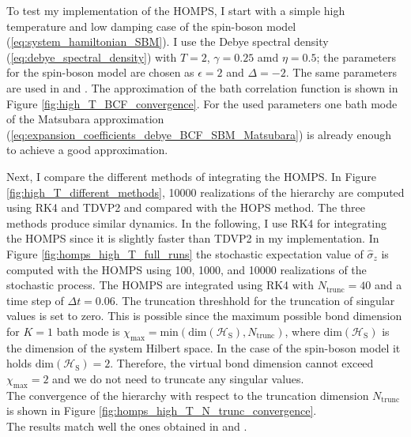 To test my implementation of the HOMPS, I start with a simple high temperature and low damping case of the spin-boson model (\ref{eq:system_hamiltonian_SBM}). 
I use the Debye spectral density (\ref{eq:debye_spectral_density}) with $T = 2$, $\gamma = 0.25$ amd $\eta = 0.5$; the parameters
for the spin-boson model are chosen as $\epsilon = 2$ and $\Delta = -2$. The same parameters are used in \cite{Gao:2022} and \cite{Song:2016}.
The approximation of the bath correlation function is shown in Figure \ref{fig:high_T_BCF_convergence}. For the used parameters one bath mode
of the Matsubara approximation (\ref{eq:expansion_coefficients_debye_BCF_SBM_Matsubara}) is already enough to achieve a good approximation.


\newpage
\noindent Next, I compare the different methods of integrating the HOMPS. In Figure \ref{fig:high_T_different_methods},
10000 realizations of the hierarchy are computed using RK4 and TDVP2 and compared with the HOPS method. The three methods
produce similar dynamics. In the following, I use RK4 for integrating the HOMPS since it is slightly faster than TDVP2 in my
implementation.
\newline
\noindent In Figure \ref{fig:homps_high_T_full_runs} the stochastic expectation value of $\hat{\sigma}_z$ is computed with the HOMPS using 100, 1000, and 10000 realizations
of the stochastic process. The HOMPS are integrated using RK4 with $N_\text{trunc} = 40$ and a time step of $\Delta t = 0.06$. The truncation threshhold for the truncation of singular values is set to zero. This is possible since the maximum possible
bond dimension for $K=1$ bath mode is $\chi_\text{max} = \text{min}\left(\text{dim}\left(\mathcal{H}_\text{S}\right), N_\text{trunc}\right)$, where $\text{dim}\left(\mathcal{H}_\text{S}\right)$
is the dimension of the system Hilbert space. In the case of the spin-boson model it holds $\text{dim}\left(\mathcal{H}_\text{S}\right) = 2$.
Therefore, the virtual bond dimension cannot exceed $\chi_\text{max} = 2$ and we do not need to truncate any singular values.\\
The convergence of the hierarchy with respect to the truncation dimension $N_\text{trunc}$ is shown in Figure \ref{fig:homps_high_T_N_trunc_convergence}. \\
The results match well the ones obtained in \cite{Suess:2014} and \cite{Song:2016}.
